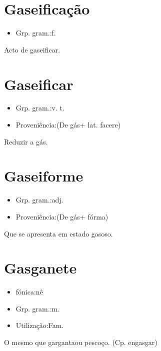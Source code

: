 \section{Gaseificação}
\begin{itemize}
\item {Grp. gram.:f.}
\end{itemize}
Acto de gaseificar.
\section{Gaseificar}
\begin{itemize}
\item {Grp. gram.:v. t.}
\end{itemize}
\begin{itemize}
\item {Proveniência:(De \textunderscore gás\textunderscore  + lat. \textunderscore facere\textunderscore )}
\end{itemize}
Reduzir a gás.
\section{Gaseiforme}
\begin{itemize}
\item {Grp. gram.:adj.}
\end{itemize}
\begin{itemize}
\item {Proveniência:(De \textunderscore gás\textunderscore  + \textunderscore fórma\textunderscore )}
\end{itemize}
Que se apresenta em estado gasoso.
\section{Gasganete}
\begin{itemize}
\item {fónica:nê}
\end{itemize}
\begin{itemize}
\item {Grp. gram.:m.}
\end{itemize}
\begin{itemize}
\item {Utilização:Fam.}
\end{itemize}
O mesmo que \textunderscore garganta\textunderscore  ou \textunderscore pescoço\textunderscore .
(Cp. \textunderscore engasgar\textunderscore )
